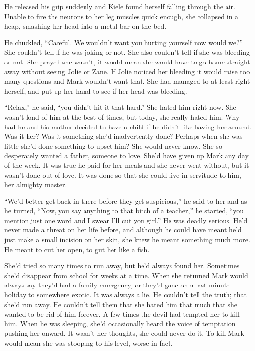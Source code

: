 He released his grip suddenly and Kiele found herself falling through the air.  Unable to fire the neurons to her leg muscles quick enough, she collapsed in a heap, smashing her head into a metal bar on the bed.

He chuckled, ``Careful.  We wouldn't want you hurting yourself now would we?''  She couldn't tell if he was joking or not.  She also couldn't tell if she was bleeding or not.  She prayed she wasn't, it would mean she would have to go home straight away without seeing Jolie or Zane.  If Jolie noticed her bleeding it would raise too many questions and Mark wouldn't want that.  She had managed to at least right herself, and put up her hand to see if her head was bleeding.

``Relax,'' he said, ``you didn't hit it that hard.''  She hated him right now.  She wasn't fond of him at the best of times, but today, she really hated him.  Why had he and his mother decided to have a child if he didn't like having her around.  Was it her?  Was it something she'd inadvertently done?  Perhaps when she was little she'd done something to upset him?  She would never know.  She so desperately wanted a father, someone to love.  She'd have given up Mark any day of the week.  It was true he paid for her meals and she never went without, but it wasn't done out of love.  It was done so that she could live in servitude to him, her almighty master.

``We'd better get back in there before they get suspicious,'' he said to her and as he turned,  ``Now, you say anything to that bitch of a teacher,'' he started, ``you mention just one word and I swear I'll cut you girl.''  He was deadly serious.  He'd never made a threat on her life before, and although he could have meant he'd just make a small incision on her skin, she knew he meant something much more.  He meant to cut her open, to gut her like a fish.  



\thoughtbreak



She'd tried so many times to run away, but he'd always found her.  Sometimes she'd disappear from school for weeks at a time.  When she returned Mark would always say they'd had a family emergency, or they'd gone on a last minute holiday to somewhere exotic.  It was always a lie.  He couldn't tell the truth; that she'd run away.  He couldn't tell them that she hated him that much that she wanted to be rid of him forever.  A few times the devil had tempted her to kill him.  When he was sleeping, she'd occasionally heard the voice of temptation pushing her onward.  It wasn't her thoughts, she could never do it.  To kill Mark would mean she was stooping to his level, worse in fact.

